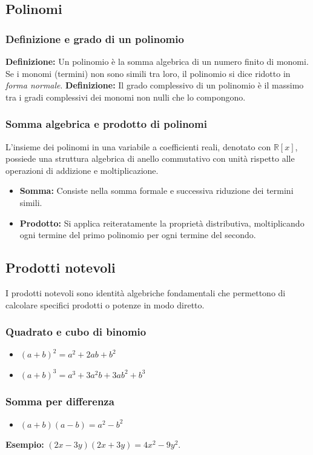\subsection{Polinomi}
\subsubsection{Definizione e grado di un polinomio}
\textbf{Definizione:} Un polinomio è la somma algebrica di un numero finito di monomi. Se i monomi (termini) non sono simili tra loro, il polinomio si dice ridotto in \textit{forma normale}.
\textbf{Definizione:} Il grado complessivo di un polinomio è il massimo tra i gradi complessivi dei monomi non nulli che lo compongono.

\subsubsection{Somma algebrica e prodotto di polinomi}
L'insieme dei polinomi in una variabile a coefficienti reali, denotato con $\mathbb{R}[x]$, possiede una struttura algebrica di anello commutativo con unità rispetto alle operazioni di addizione e moltiplicazione.
\begin{itemize}
    \item \textbf{Somma:} Consiste nella somma formale e successiva riduzione dei termini simili.
    \item \textbf{Prodotto:} Si applica reiteratamente la proprietà distributiva, moltiplicando ogni termine del primo polinomio per ogni termine del secondo.
\end{itemize}

\subsection{Prodotti notevoli}
I prodotti notevoli sono identità algebriche fondamentali che permettono di calcolare specifici prodotti o potenze in modo diretto.
\subsubsection{Quadrato e cubo di binomio}
\begin{itemize}
    \item $(a+b)^2 = a^2 + 2ab + b^2$
    \item $(a+b)^3 = a^3 + 3a^2b + 3ab^2 + b^3$
\end{itemize}
\subsubsection{Somma per differenza}
\begin{itemize}
    \item $(a+b)(a-b) = a^2 - b^2$
\end{itemize}
\textbf{Esempio:} $(2x - 3y)(2x + 3y) = 4x^2 - 9y^2$.
